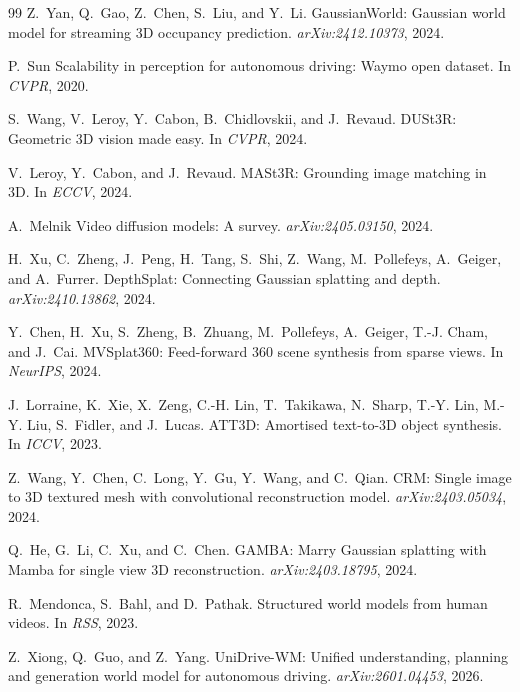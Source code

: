 \begin{thebibliography}{99}
Z.~Yan, Q.~Gao, Z.~Chen, S.~Liu, and Y.~Li.
{GaussianWorld}: Gaussian world model for streaming 3{D} occupancy prediction.
\emph{arXiv:2412.10373}, 2024.

P.~Sun \etal
Scalability in perception for autonomous driving: {Waymo} open dataset.
In \emph{CVPR}, 2020.

S.~Wang, V.~Leroy, Y.~Cabon, B.~Chidlovskii, and J.~Revaud.
{DUSt3R}: Geometric 3{D} vision made easy.
In \emph{CVPR}, 2024.

V.~Leroy, Y.~Cabon, and J.~Revaud.
{MASt3R}: Grounding image matching in 3{D}.
In \emph{ECCV}, 2024.

A.~Melnik \etal
Video diffusion models: A survey.
\emph{arXiv:2405.03150}, 2024.

H.~Xu, C.~Zheng, J.~Peng, H.~Tang, S.~Shi, Z.~Wang, M.~Pollefeys, A.~Geiger, and A.~Furrer.
{DepthSplat}: Connecting Gaussian splatting and depth.
\emph{arXiv:2410.13862}, 2024.

Y.~Chen, H.~Xu, S.~Zheng, B.~Zhuang, M.~Pollefeys, A.~Geiger, T.-J. Cham, and J.~Cai.
{MVSplat360}: Feed-forward 360 scene synthesis from sparse views.
In \emph{NeurIPS}, 2024.

J.~Lorraine, K.~Xie, X.~Zeng, C.-H. Lin, T.~Takikawa, N.~Sharp, T.-Y. Lin, M.-Y. Liu, S.~Fidler, and J.~Lucas.
{ATT3D}: Amortised text-to-3{D} object synthesis.
In \emph{ICCV}, 2023.

Z.~Wang, Y.~Chen, C.~Long, Y.~Gu, Y.~Wang, and C.~Qian.
{CRM}: Single image to 3{D} textured mesh with convolutional reconstruction model.
\emph{arXiv:2403.05034}, 2024.

Q.~He, G.~Li, C.~Xu, and C.~Chen.
{GAMBA}: Marry Gaussian splatting with Mamba for single view 3{D} reconstruction.
\emph{arXiv:2403.18795}, 2024.

R.~Mendonca, S.~Bahl, and D.~Pathak.
Structured world models from human videos.
In \emph{RSS}, 2023.

Z.~Xiong, Q.~Guo, and Z.~Yang.
{UniDrive-WM}: Unified understanding, planning and generation world model for autonomous driving.
\emph{arXiv:2601.04453}, 2026.


\end{thebibliography}
